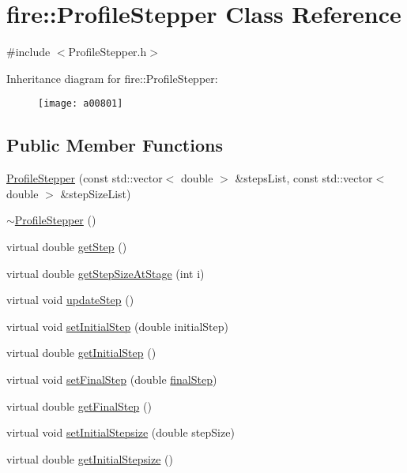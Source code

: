 \hypertarget{a00801}{}\section{fire\+:\+:Profile\+Stepper Class Reference}
\label{a00801}


{\ttfamily \#include $<$Profile\+Stepper.\+h$>$}

Inheritance diagram for fire\+:\+:Profile\+Stepper\+:\begin{figure}[H]
\begin{center}
\leavevmode
\texttt{[image: a00801]}
\end{center}
\end{figure}
\subsection*{Public Member Functions}
\begin{DoxyCompactItemize}
\item 
\hyperlink{a00801_a5bba5babbcb293b5e6a535cc4d06c55f}{Profile\+Stepper} (const std\+::vector$<$ double $>$ \&steps\+List, const std\+::vector$<$ double $>$ \&step\+Size\+List)
\item 
\hyperlink{a00801_a6838143d952dec2519a43c576a1f1546}{$\sim$\+Profile\+Stepper} ()
\item 
virtual double \hyperlink{a00801_a9096ad65a3fcf63678b600cbe0c33961}{get\+Step} ()
\item 
virtual double \hyperlink{a00801_adaa1a23c068977ecc6809dd8eecab49d}{get\+Step\+Size\+At\+Stage} (int i)
\item 
virtual void \hyperlink{a00801_a2c13fd4da5550f1e58df2b54bbfe4c2c}{update\+Step} ()
\item 
virtual void \hyperlink{a00801_adf2f78648d9539282225117c0fd243af}{set\+Initial\+Step} (double initial\+Step)
\item 
virtual double \hyperlink{a00801_af24660fa4bd027f877d5c1bdeb286cf5}{get\+Initial\+Step} ()
\item 
virtual void \hyperlink{a00801_af8203296b4f3bef53bafab7cb654cc97}{set\+Final\+Step} (double \hyperlink{a00801_a4f2347f039417fe9cdd16d3ca74a072d}{final\+Step})
\item 
virtual double \hyperlink{a00801_ae6f257aca7b3bb62a851169a01bcaacf}{get\+Final\+Step} ()
\item 
virtual void \hyperlink{a00801_a55c44fd97d8b6a474243ad0da48b039d}{set\+Initial\+Stepsize} (double step\+Size)
\item 
virtual double \hyperlink{a00801_a86e7035366907a08a36722655746271e}{get\+Initial\+Stepsize} ()
\end{DoxyCompactItemize}
